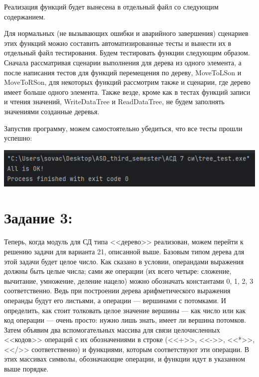 \documentclass[12pt]{article}
\begin{document}
{	 
		
	Реализация функций будет вынесена в отдельный файл со следующим содержанием.
		
	 
		
	Для нормальных (не вызывающих ошибки и аварийного завершения) сценариев этих функций можно составить автоматизированные тесты и вынести их в отдельный файл тестирования. Будем тестировать функции следующим образом. Сначала рассматривая сценарии выполнения для дерева из одного элемента, а после написания тестов для функций перемещения по дереву, MoveToLSon и MoveToRSon, для некоторых функций рассмотрим также и сценарии, где дерево имеет больше одного элемента. Также везде, кроме как в тестах функций записи и чтения значений, WriteDataTree и ReadDataTree, не будем заполнять значениями созданные деревья.
		
	 
		
	Запустив программу, можем самостоятельно убедиться, что все тесты прошли успешно:
	
	\includegraphics[width=170mm]{images/tree_test_output.png} 
	
	\section{Задание 3:}
	\label{task_3}
	
	Теперь, когда модуль для СД типа <<дерево>> реализован, можем перейти к решению задачи для варианта 21, описанной выше. Базовым типом дерева для этой задачи будет целое число. Как сказано в условии, операндами выражения должны быть целые числа; сами же операции (их всего четыре: сложение, вычитание, умножение, деление нацело) можно обозначать константами 0, 1, 2, 3 соответственно. Ведь при построении дерева арифметического выражения операнды будут его листьями, а операции --- вершинами с потомками. И определить, как стоит толковать целое значение вершины --- как число или как код операции --- очень просто: нужно лишь знать, имеет ли вершина потомков. Затем объявим два вспомогательных массива для связи целочисленных <<кодов>> операций с их обозначениями в строке (<<+>>, <<->>, <<*>>, <</>> соответственно) и функциями, которым соответствуют эти операции. В этих массивах символы, обозначающие операции, и функции идут в указанном выше порядке. 
	
}
\end{document}
